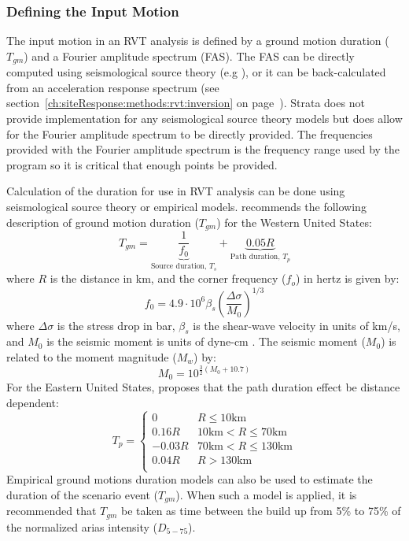 \documentclass[11pt]{report}
\begin{document}
\subsubsection{Defining the Input Motion}
The input motion in an RVT analysis is defined by a ground motion duration ($T_{gm}$) and a Fourier
amplitude spectrum (FAS).  The FAS can be directly computed using seismological source theory (e.g
\citep[e.g.][]{brune:70,brune:71}), or it can be back-calculated from an acceleration response
spectrum (see section~\ref{ch:siteResponse:methods:rvt:inversion} on
page~\pageref{ch:siteResponse:methods:rvt:inversion}).  Strata does not provide implementation for
any seismological source theory models but does allow for the Fourier amplitude spectrum to be
directly provided.  The frequencies provided with the Fourier amplitude spectrum is the frequency
range used by the program so it is critical that enough points be provided.

Calculation of the duration for use in RVT analysis can be done using seismological source theory or
empirical models.  \citet{boore:03} recommends the following description of ground motion duration
($T_{gm}$) for the Western United States:
\begin{equation}
  T_{gm} =  \underbrace{\frac{1}{f_0}}_\text{Source duration, $T_s$} + \underbrace{0.05
  R}_\text{Path duration, $T_p$}
\end{equation}
where $R$ is the distance in km, and the corner frequency ($f_o$) in hertz is given by:
\begin{displaymath}
	f_0 = 4.9 \cdot 10^6 \beta_s \left( \frac{\Delta\sigma}{M_0} \right)^{1/3} 
\end{displaymath}
where $\Delta\sigma$ is the stress drop in bar, $\beta_s$ is the shear-wave velocity in units of
km/s, and $M_0$ is the seismic moment is units of dyne-cm \citep{brune:70,brune:71}.  The seismic
moment ($M_0$) is related to the moment magnitude ($M_w$) by:
\begin{displaymath}
	M_0 = 10^{\frac{3}{2}\left( M_0 + 10.7 \right)}
\end{displaymath}
For the Eastern United States, \citet{campbell:03} proposes that the path duration effect be
distance dependent:
\begin{equation}
  T_p = \left\{
  \begin{array}{ll}
	0 & R \le 10 \text{km} \\
	0.16R & 10 \text{km} < R \le 70 \text{km} \\
	-0.03R & 70 \text{km} < R \le 130 \text{km} \\
	0.04R & R > 130 \text{km} \\
  \end{array}
  \right.
\end{equation}
Empirical ground motions duration models \citep[e.g.][]{abrahamson:96} can also be used to estimate the duration of the scenario
event ($T_{gm}$).  When such a model is applied, it is recommended that $T_{gm}$ be taken as time
between the build up from 5\% to 75\% of the normalized arias intensity ($D_{5-75}$).
\end{document}
